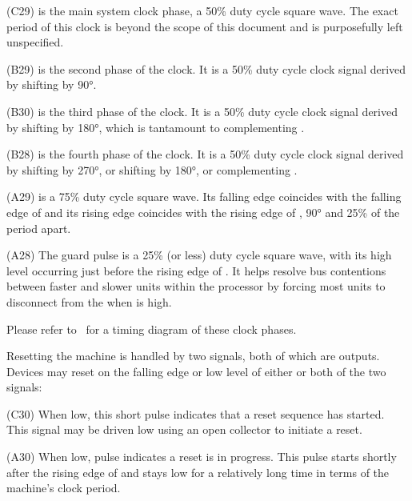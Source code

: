 \begin{description}
  \item{\bfseries {}} (C29) is the main system clock phase, a 50\% duty
    cycle square wave. The exact period of this clock is beyond the
    scope of this document and is purposefully left unspecified.
  \item{\bfseries {}} (B29) is the second phase of the clock. It is a 50\% duty
    cycle clock signal derived by shifting  by 90°.
  \item{\bfseries {}} (B30) is the third phase of the clock. It is a
    50\% duty cycle clock signal derived by shifting  by 180°,
    which is tantamount to complementing .
  \item{\bfseries {}} (B28) is the fourth phase of the clock. It is a
    50\% duty cycle clock signal derived by shifting  by 270°,
    or shifting  by 180°, or complementing .
  \item{\bfseries {}} (A29) is a 75\% duty cycle square wave. Its
    falling edge coincides with the falling edge of  and its
    rising edge coincides with the rising edge of , 90° and
    25\% of the period apart.
  \item{\bfseries\GP} (A28) The guard pulse is a 25\% (or
    less) duty cycle square wave, with its high level occurring just
    before the rising edge of . It helps resolve bus
    contentions between faster and slower units within the processor
    by forcing most units to disconnect from the \IBUS{} when \GP{} is
    high.
\end{description}

Please refer to~ for a timing diagram of these clock phases.

Resetting the machine is handled by two signals, both of which are
outputs. Devices may reset on the falling edge or low level of either
or both of the two signals:

\begin{description}
  \item{\bfseries\RESET} (C30) When low, this short pulse indicates that a
    reset sequence has started. This signal may be driven low using an
    open collector to initiate a reset.
  \item{\bfseries\RSTHOLD} (A30) When low, pulse indicates a reset is in
    progress. This pulse starts shortly after the rising edge of
    \RESET{} and stays low for a relatively long time in terms of the
    machine's clock period.
\end{description}


